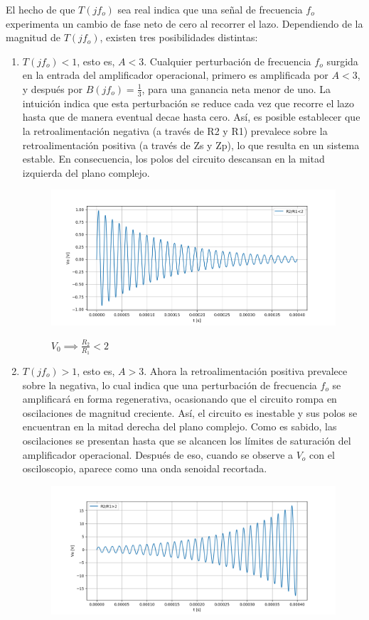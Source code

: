 El hecho de que $T(jf_o)$ sea real indica que una señal de frecuencia $f_o$ experimenta un cambio de fase neto de cero al recorrer el lazo. Dependiendo de la magnitud de $T(jf_o)$, existen tres posibilidades distintas: 
\begin{enumerate}
\item  	$T(jf_o) < 1$, esto es, $A < 3 $. Cualquier perturbación de frecuencia $f_o$ surgida en la
entrada del amplificador operacional, primero es amplificada por $A < 3$, y después por $B(jf_o) =\frac{1}{3}$, para una ganancia neta menor de uno. La intuición indica que esta perturbación se reduce cada vez que recorre el lazo hasta que de manera eventual decae hasta cero. Así, es posible establecer que la retroalimentación negativa (a través de R2 y R1) prevalece sobre la retroalimentación positiva (a través de Zs y Zp), lo que resulta en un sistema estable. En consecuencia, los polos del circuito descansan en la mitad izquierda del plano complejo. 
\begin{figure}[H]
	\centering
	\includegraphics[width=\textwidth]{Imagenes-Ej1/r1r2m.png}
	\label{fig:r1r2m}
	\caption{$V_0 \implies \frac{R_2}{R_1}<2$}
\end{figure}
\item 	 $T(jf_o) > 1$, esto es, $A> 3$. Ahora la retroalimentación positiva prevalece sobre la
negativa, lo cual indica que una perturbación de frecuencia $f_o$ se amplificará en forma regenerativa, ocasionando que el circuito rompa en oscilaciones de magnitud creciente. Así, el circuito es inestable y sus polos se encuentran en la mitad derecha del plano complejo. Como es sabido, las oscilaciones se presentan hasta que se alcancen los límites de saturación del amplificador operacional. Después de eso, cuando se observe a $V_o$ con el osciloscopio, aparece como una onda senoidal recortada.
\begin{figure}[H]
	\centering
	\includegraphics[width=\textwidth]{Imagenes-Ej1/r1r2g.png}

\end{figure}
\end{enumerate}
